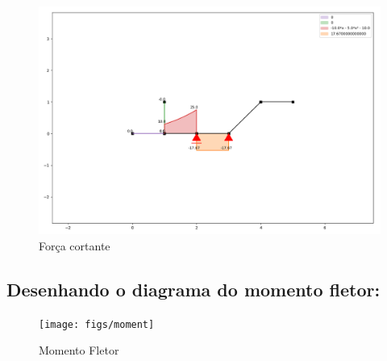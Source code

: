 \documentclass[a4paper,12pt]{article}%
\begin{document}
\begin{figure}[H]%
\centering%
\includegraphics[width=500px]{figs/shear}%
\caption{\label{fig:cortante} Força cortante}%
\end{figure}

%
\subsection{Desenhando o diagrama do momento fletor:}%
\label{subsec:Desenhandoodiagramadomomentofletor}%


\begin{figure}[H]%
\centering%
\texttt{[image: figs/moment]}%
\caption{\label{fig:momento} Momento Fletor}%
\end{figure}

%
\end{document}
